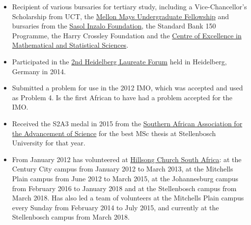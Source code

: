 \documentclass{article}
\begin{document}
\begin{itemize}
	\item Recipient of various bursaries for tertiary study, including a Vice-Chancellor's Scholarship from UCT, the \href{http://www.mmuf.org/}{Mellon Mays Undergraduate Fellowship} and bursaries from the \href{https://www.sasol.com/sustainability/social-investment/inzalo-foundation}{Sasol Inzalo Foundation}, the Standard Bank 150 Programme, the Harry Crossley Foundation and the \href{https://www.wits.ac.za/coe-mass/}{Centre of Excellence in Mathematical and Statistical Sciences}.
	\item Participated in the \href{http://www.heidelberg-laureate-forum.org/event_2014/}{2nd Heidelberg Laureate Forum} held in Heidelberg, Germany in 2014.
  \item Submitted a problem for use in the 2012 IMO, which was accepted and used as Problem 4. Is the first African to have had a problem accepted for the IMO.
	\item Received the S2A3 medal in 2015 from the \href{http://s2a3.org.za/joomla/index.php}{Southern African Association for the Advancement of Science} for the best MSc thesis at Stellenbosch University for that year.
	\item From January 2012 has volunteered at \href{http://www.hillsong.co.za}{Hillsong Church South Africa}: at the Century City campus from January 2012 to March 2013, at the Mitchells Plain campus from June 2012 to March 2015, at the Johannesburg campus from February 2016 to January 2018 and at the Stellenbosch campus from March 2018. Has also led a team of volunteers at the Mitchells Plain campus every Sunday from February 2014 to July 2015, and currently at the Stellenbosch campus from March 2018.

\end{itemize}
\end{document}

